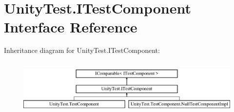 \hypertarget{interface_unity_test_1_1_i_test_component}{}\section{Unity\+Test.\+I\+Test\+Component Interface Reference}
\label{interface_unity_test_1_1_i_test_component}
Inheritance diagram for Unity\+Test.\+I\+Test\+Component\+:\begin{figure}[H]
\begin{center}
\leavevmode
\includegraphics[height=2.847458cm]{interface_unity_test_1_1_i_test_component}
\end{center}
\end{figure}
